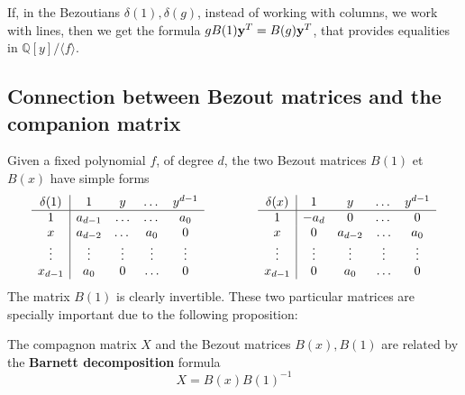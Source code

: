 \documentclass{standalone}
\begin{document}
\begin{rem}
If, in the Bezoutians $\delta(1), \delta(g)$, instead of working with columns, we work with lines, then we get the formula 
$gB(1)\bold{y}^T = B(g)\bold{y}^T$, that provides equalities in $\mathbb{Q}[y]/\langle f \rangle$.
\end{rem}


\subsection{Connection between Bezout matrices and the companion matrix}
\label{Bar}
Given a fixed polynomial $f$, of degree $d$, the two Bezout matrices $B(1)$ et $B(x)$ have simple forms
\begin{equation}
	\begin{array}{c|cccc}
		\delta(1) & 1 & y & \dots & y^{d-1} \\
		\hline
		1 & a_{d-1} & \ldots & \dots & a_0 \\
		x & a_{d-2} & \dots & a_0 & 0 \\
		\vdots & \vdots & \vdots & \vdots & \vdots \\
		x_{d-1} & a_0 & 0 & \ldots & 0 \\
	\end{array}
	\hspace{1.5cm}
	\begin{array}{c|cccc}
		\delta(x) & 1 & y & \dots & y^{d-1} \\
		\hline
		1 & -a_{d} & 0 & \dots & 0 \\
		x & 0 & a_{d-2} & \ldots & a_0 \\
		\vdots & \vdots & \vdots & \vdots & \vdots \\
		x_{d-1} & 0 & a_0 & \ldots & 0 \\
	\end{array}
\end{equation}
The matrix $B(1)$ is clearly invertible. These two particular matrices are specially important due to the following proposition:
\begin{prop}
\label{Barnett}
The compagnon matrix $X$ and the Bezout matrices $B(x), B(1)$ are related by the {\bf Barnett decomposition} formula
\cite{Barnett}
\begin{equation}
	X = B(x)B(1)^{-1}
\end{equation}
\end{prop}
\end{document}
